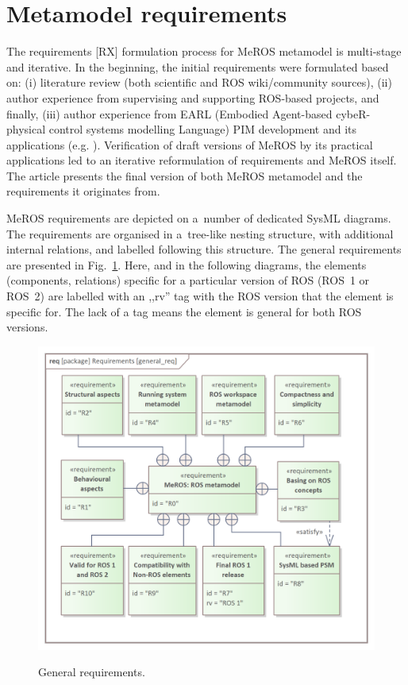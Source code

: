 \documentclass{ieeeaccess}
\begin{document}
	
\section{Metamodel requirements}
\label{sec:requirements}
	The requirements [RX] formulation process for MeROS metamodel is multi-stage and iterative. In the beginning, the initial requirements were formulated based on: (i) literature review (both scientific and ROS wiki/community sources), (ii) author experience from supervising and supporting ROS-based projects, and finally, (iii) author experience from EARL (Embodied Agent-based cybeR-physical control systems modelling Language) \cite{earl2020} PIM development and its applications (e.g. \cite{tasker2020,karwowski2021hubero,en14206693-grav-comp}). Verification of draft versions of MeROS by its practical applications led to an iterative reformulation of requirements and MeROS itself. The article presents the final version of both MeROS metamodel and the requirements it originates from.
	
	MeROS requirements are depicted on a~number of dedicated SysML diagrams. The requirements are organised in a~tree-like nesting structure, with additional internal relations, and labelled following this structure. The general requirements are presented in Fig.~\ref{fig:general_req}. Here, and in the following diagrams, the elements (components, relations) specific for a particular version of ROS (ROS~1 or ROS~2) are labelled with an ,,rv''  tag with the ROS version that the element is specific for. The lack of a tag means the element is general for both ROS versions.
	
	\begin{figure}[htb]
		\centering
		\begin{center}
			{\includegraphics[scale=0.7]{img/requirement_pkg/general_req.png}}
		\end{center}
		\caption{General requirements.} 
		\label{fig:general_req}
	\end{figure}
	
\end{document}
